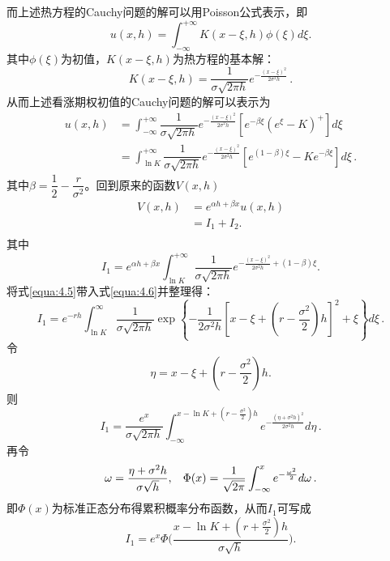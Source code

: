 \documentclass[oneside]{sysuthesis}
\begin{document}
而上述热方程的Cauchy问题的解可以用Poisson公式表示\cite{evans2010pde}，即
\begin{equation*}
	u(x,h)=\int_{-\infty}^{+\infty}K(x-\xi,h)\phi(\xi)d\xi.
\end{equation*}
其中$\phi(\xi)$为初值，$K(x-\xi,h)$为热方程的基本解：
\begin{equation*}
	K(x-\xi,h)=\dfrac{1}{\sigma\sqrt{2\pi h}}e^{-\frac{(x-\xi)^2}{2\sigma^2 h}}\,.
\end{equation*}
从而上述看涨期权初值的Cauchy问题的解可以表示为
\begin{equation*}
	\begin{split}
		u(x,h)&=\int_{-\infty}^{+\infty}\dfrac{1}{\sigma\sqrt{2\pi h}}e^{-\frac{(x-\xi)^2}{2\sigma^2 h}}\left[e^{-\beta\xi}(e^\xi-K)^+\right]d\xi\\
		&=\int_{\ln K}^{+\infty}\dfrac{1}{\sigma\sqrt{2\pi h}}e^{-\frac{(x-\xi)^2}{2\sigma^2 h}}\left[e^{(1-\beta)\xi}-Ke^{-\beta\xi}\right]d\xi\,.
	\end{split}
\end{equation*}
其中$\beta=\dfrac{1}{2}-\dfrac{r}{\sigma^2}$。回到原来的函数$V(x,h)$
\begin{equation*}
	\begin{split}
		V(x,h)&=e^{\alpha h+\beta x}u(x,h)\\
		&=I_1+I_2.\\
	\end{split}
\end{equation*}
其中
\begin{equation}\label{equa:4.6}
	I_1=e^{\alpha h+\beta x}\int_{\ln K}^{+\infty}\dfrac{1}{\sigma\sqrt{2\pi h}}e^{-\frac{(x-\xi)^2}{2\sigma^2 h}+(1-\beta)\xi}.
\end{equation}
将式\ref{equa:4.5}带入式\ref{equa:4.6}并整理得：
\begin{equation*}
	I_1=e^{-rh}\int_{\ln K}^{\infty}\dfrac{1}{\sigma\sqrt{2\pi h}}\exp\left\{-\dfrac{1}{2\sigma^2 h}\left[x-\xi+(r-\dfrac{\sigma^2}{2})h\right]^2+\xi\right\}d\xi\,.
\end{equation*}
令
\begin{equation*}
	\eta=x-\xi+(r-\dfrac{\sigma^2}{2})h.
\end{equation*}
则
\begin{equation*}
	I_1=\dfrac{e^x}{\sigma\sqrt{2\pi h}}\int_{-\infty}^{x-\ln K+(r-\frac{\sigma^2}{2})h}e^{-\frac{(\eta+\sigma^2h)^2}{2\sigma^2 h}}d\eta\,.
\end{equation*}
再令
\begin{equation*}
	\omega=\dfrac{\eta+\sigma^2 h}{\sigma\sqrt{h}},\hspace{0.3cm}\Phi(x)=\dfrac{1}{\sqrt{2\pi}}\int_{-\infty}^{x}e^{-\frac{\omega^2}{2}}d\omega\,.
\end{equation*}
即$\Phi(x)$为标准正态分布得累积概率分布函数，从而$I_1$可写成
\begin{equation*}
	I_1=e^x\Phi\Bigg(\dfrac{x-\ln K+(r+\frac{\sigma^2}{2})h}{\sigma\sqrt{h}}\Bigg).
\end{equation*}
\end{document}
